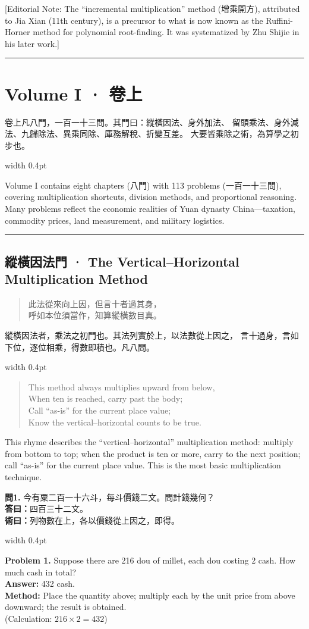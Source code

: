 \documentclass[10pt,a4paper]{article}
\newcommand{\longline}{\noindent\rule{\textwidth}{0.3pt}}
\newlength{\cnwidth}
\newlength{\enwidth}
\newcommand{\bilingual}[2]{%
  \noindent%
  \begin{minipage}[t]{\cnwidth}%
    #1%
  \end{minipage}%
  \hfill\vrule width 0.4pt\hfill%
  \begin{minipage}[t]{\enwidth}%
    #2%
  \end{minipage}%
  \par\smallskip%
}
\newcommand{\bilingualsection}[2]{%
  \section*{#1 · #2}
  \addcontentsline{toc}{section}{#1 · #2}
}
\newcommand{\bilingualsubsection}[2]{%
  \subsection*{#1 · #2}
}
\newenvironment{rhymecn}{%
  \begin{quote}\itshape\color{verselinecolor}
}{\end{quote}}
\newcommand{\transnote}[1]{%
  \par\smallskip\noindent\textcolor{notecolor}{\small[Editorial Note: #1]}\par\smallskip
}
\begin{document}
\transnote{The ``incremental multiplication'' method (增乘開方), attributed to Jia Xian
(11th century), is a precursor to what is now known as the Ruffini-Horner method
for polynomial root-finding. It was systematized by Zhu Shijie in his later work.}

\longline


\bilingualsection{Volume I}{卷上}
\label{sec:volume1}

\bilingual{%
  卷上凡八門，一百一十三問。其門曰：縱橫因法、身外加法、
  留頭乘法、身外減法、九歸除法、異乘同除、庫務解稅、折變互差。
  大要皆乘除之術，為算學之初步也。
}{%
  Volume I contains eight chapters (八門) with 113 problems (一百一十三問),
  covering multiplication shortcuts, division methods, and proportional reasoning.
  Many problems reflect the economic realities of Yuan dynasty China---taxation,
  commodity prices, land measurement, and military logistics.
}

\longline

\bilingualsubsection{縱橫因法門}{The Vertical--Horizontal Multiplication Method}
\label{sec:zongheng}

\bilingual{%
  \begin{rhymecn}
  此法從來向上因，但言十者過其身，\\
  呼如本位須當作，知算縱橫數目真。
  \end{rhymecn}
  縱橫因法者，乘法之初門也。其法列實於上，以法數從上因之，
  言十過身，言如下位，逐位相乘，得數即積也。凡八問。
}{%
  \begin{rhymecn}
  This method always multiplies upward from below,\\
  When ten is reached, carry past the body;\\
  Call ``as-is'' for the current place value;\\
  Know the vertical--horizontal counts to be true.
  \end{rhymecn}
  This rhyme describes the ``vertical--horizontal'' multiplication method:
  multiply from bottom to top; when the product is ten or more, carry to the
  next position; call ``as-is'' for the current place value. This is the most
  basic multiplication technique.
}

\bilingual{%
  \textbf{問1.}
  今有粟二百一十六斗，每斗價錢二文。問計錢幾何？\\
  \textbf{答曰：}四百三十二文。\\
  \textbf{術曰：}列物數在上，各以價錢從上因之，即得。
}{%
  \textbf{Problem 1.}
  Suppose there are 216 dou of millet, each dou costing 2 cash.
  How much cash in total?\\
  \textbf{Answer:} 432 cash.\\
  \textbf{Method:} Place the quantity above; multiply each by the unit price
  from above downward; the result is obtained.\\
  (Calculation: $216 \times 2 = 432$)
}
\end{document}
